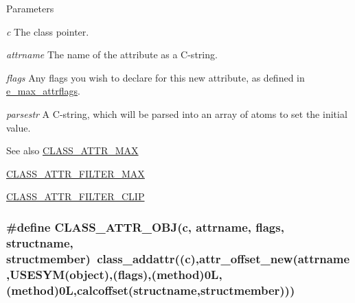 \begin{DoxyParams}{Parameters}
\item[{\em c}]The class pointer. \item[{\em attrname}]The name of the attribute as a C-\/string. \item[{\em flags}]Any flags you wish to declare for this new attribute, as defined in \hyperlink{group__attr_gaf296cfc6741bb19207f6ed8062809115}{e\_\-max\_\-attrflags}. \item[{\em parsestr}]A C-\/string, which will be parsed into an array of atoms to set the initial value. \end{DoxyParams}
\begin{DoxySeeAlso}{See also}
\hyperlink{group__attr_ga80157be7023be017f33e5c80b6f845d6}{CLASS\_\-ATTR\_\-MAX} 

\hyperlink{group__attr_ga6d756455a9923aa01a16796b7d458fd9}{CLASS\_\-ATTR\_\-FILTER\_\-MAX} 

\hyperlink{group__attr_ga7a9fa82b3419df8a770830fb34df39b0}{CLASS\_\-ATTR\_\-FILTER\_\-CLIP} 
\end{DoxySeeAlso}
\hypertarget{group__attr_gae5165b6a5bba9ad1b351263705f6059d}{
\subsubsection[{CLASS\_\-ATTR\_\-OBJ}]{\setlength{\rightskip}{0pt plus 5cm}\#define CLASS\_\-ATTR\_\-OBJ(c, \/  attrname, \/  flags, \/  structname, \/  structmember)~class\_\-addattr((c),attr\_\-offset\_\-new(attrname,USESYM(object),(flags),({\bf method})0L,(method)0L,calcoffset(structname,structmember)))}}
\label{group__attr_gae5165b6a5bba9ad1b351263705f6059d}


